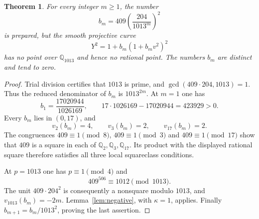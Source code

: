 \documentclass[11pt,a4paper]{article}
\newtheorem{theorem}{Theorem}[section]
\theoremstyle{definition}\newtheorem{definition}[theorem]{Definition}
\newcommand{\Q}{\mathbb Q}\newcommand{\Z}{\mathbb Z}
\begin{document}
\begin{theorem}\label{thm:family}
For every integer $m\ge1$, the number
\[
                         b_m=409\left(\frac{204}{1013^m}\right)^2
\]
is prepared, but the smooth projective curve
\begin{equation}\label{eq:family}
                         Y^2=1+b_m(1+b_mv^2)^2
\end{equation}
has no point over $\Q_{1013}$ and hence no rational point.
The numbers $b_m$ are distinct and tend to zero.
\end{theorem}
\begin{proof}
Trial division certifies that $1013$ is prime, and
$\gcd(409\cdot204,1013)=1$. Thus the reduced denominator of
$b_m$ is $1013^{2m}$. At $m=1$ one has
\[
 b_1=\frac{17020944}{1026169},\qquad
 17\cdot1026169-17020944=423929>0.
\]
Every $b_m$ lies in $(0,17)$, and
\[
          v_2(b_m)=4,\qquad v_3(b_m)=2,
                         \qquad v_{17}(b_m)=2.
\]
The congruences $409\equiv1\pmod8$, $409\equiv1\pmod3$
and $409\equiv1\pmod{17}$ show that $409$ is a square in
each of $\Q_2,\Q_3,\Q_{17}$. Its product with the displayed
rational square therefore satisfies all three local squareclass
conditions.

At $p=1013$ one has $p\equiv1\pmod4$ and
\[
                        409^{506}\equiv1012\pmod{1013}.
\]
The unit $409\cdot204^2$ is consequently a nonsquare modulo
$1013$, and $v_{1013}(b_m)=-2m$.
Lemma~\ref{lem:negative}, with $\kappa=1$, applies.
Finally $b_{m+1}=b_m/1013^2$, proving the last assertion.
\end{proof}
\end{document}
